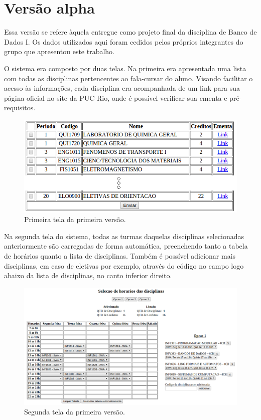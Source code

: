 \documentclass[graduacao,brazil]{ThesisPUC}
\begin{document}
\section{Versão alpha}

Essa versão se refere àquela entregue como projeto final da disciplina de Banco de Dados I. Os dados utilizados aqui foram cedidos pelos próprios integrantes do grupo que apresentou este trabalho.

O sistema era composto por duas telas. Na primeira era apresentada uma lista com todas as disciplinas pertencentes ao fala-cursar do aluno. Visando facilitar o acesso às informações, cada disciplina era acompanhada de um link para sua página oficial no site da PUC-Rio, onde é possível verificar sua ementa e pré-requisitos.

\begin{figure}[H]
    \centering
    \includegraphics[width=0.7\linewidth]{img/v1_p1.png}
    \caption{Primeira tela da primeira versão.}
\end{figure}

Na segunda tela do sistema, todas as turmas daquelas disciplinas selecionadas anteriormente são carregadas de forma automática, preenchendo tanto a tabela de horários quanto a lista de disciplinas. Também é possível adicionar mais disciplinas, em caso de eletivas por exemplo, através do código no campo logo abaixo da lista de disciplinas, no canto inferior direito.

\begin{figure}[H]
    \centering
    \includegraphics[width=\linewidth]{img/v1_p2.png}
    \caption{Segunda tela da primeira versão.}
\end{figure}
\end{document}
